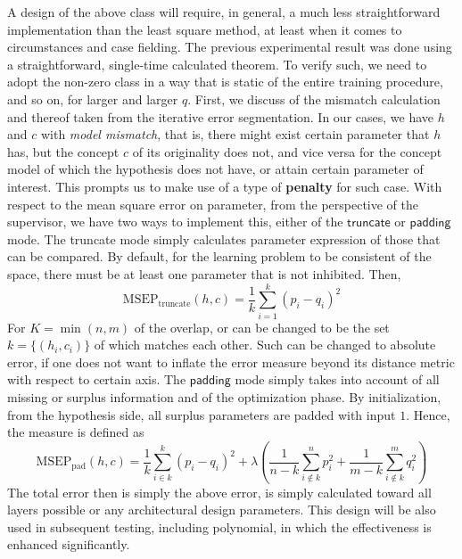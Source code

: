\documentclass[10pt]{article} %
\begin{document}
A design of the above class will require, in general, a much less straightforward implementation than the least square method, at least when it comes to circumstances and case fielding. The previous experimental result was done using a straightforward, single-time calculated theorem. To verify such, we need to adopt the non-zero class in a way that is static of the entire training procedure, and so on, for larger and larger $q$. First, we discuss of the mismatch calculation and thereof taken from the iterative error segmentation. In our cases, we have $h$ and $c$ with \textit{model mismatch}, that is, there might exist certain parameter that $h$ has, but the concept $c$ of its originality does not, and vice versa for the concept model of which the hypothesis does not have, or attain certain parameter of interest. This prompts us to make use of a type of \textbf{penalty} for such case. With respect to the mean square error on parameter, from the perspective of the supervisor, we have two ways to implement this, either of the $\mathsf{truncate}$ or $\mathsf{padding}$ mode. The truncate mode simply calculates parameter expression of those that can be compared. By default, for the learning problem to be consistent of the space, there must be at least one parameter that is not inhibited. Then, 
\begin{equation}
    \mathrm{MSEP}_{\text{truncate}}(h,c) = \frac{1}{k} \sum^{k}_{i=1}(p_{i}-q_{i})^{2}
\end{equation}
For $K=\min(n,m)$ of the overlap, or can be changed to be the set $k=\{(h_{i},c_{i})\}$ of which matches each other. Such can be changed to absolute error, if one does not want to inflate the error measure beyond its distance metric with respect to certain axis. The $\mathsf{padding}$ mode simply takes into account of all missing or surplus information and of the optimization phase. By initialization, from the hypothesis side, all surplus parameters are padded with input $1$. Hence, the measure is defined as 
\begin{equation}\label{eq:parameter_penalty}
    \mathrm{MSEP}_{\text{pad}}(h,c) = \frac{1}{k} \sum^{k}_{i\in k} (p_{i}-q_{i})^{2} + \lambda \left(\frac{1}{n-k}\sum^{n}_{i\not\in k}p_{i}^{2}+ \frac{1}{m-k}\sum^{m}_{i\not\in k}q_{i}^{2}\right)
\end{equation}
The total error then is simply the above error, is simply calculated toward all layers possible or any architectural design parameters. This design will be also used in subsequent testing, including polynomial, in which the effectiveness is enhanced significantly. 
\end{document}
